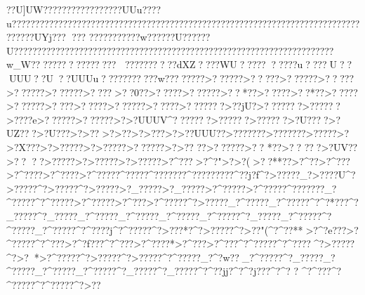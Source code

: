 {{{{{{{{{{{{{{{{{{{{{{{{{{{{{{{{{{{{{{{{{{{{{{{{{{{{{{{{{{{{{{{{{{{{{{{{{{{{{{{{{{{{{{{{{{{{{{{{{{{{{{{{{{{{{{{{{{{{{{{{{{{{{{{{{{{{{{{{{{{{{{{{{{{{{{{{{{{{{{{{{{{{{{{{{{{{{{{{{{{{{{{{{{{{{{{{{{{{{{{{{{{{{{{{{{{{{{{{{{{{{{{{{{{{{{{{{{{{{{{{{{{{{{{{{{{{{{{{{{{{{{{{{{{{{{{{{{{{{{{{{{{{{{{{{{{{{{{{{{{{{{{{{{{{{{{{{{{{{{{{{{{{{{{{{{{{{{{{{{{{{{{{{{{{{{{{{{{{{{{{{{{{{{{{{{{{{{{{{{{{{{{{{{{{{{{{{{{{{{{{{{{{{{{{{{{{{{{{{{{{{{{{{{{{{{{{{{{{{{{{{{{{{{{{{{{{{{{{{{{{{{{{{{{{{{{{{{{{{{{{{{{{{{{{{{{{{{{{{{{{{{{{{{{{{{{{{{{{{{{{{{{{{{{{{{{{{{{{{{{{{{{{{{{{{{{{{{{{{{{{{{{{{{{{{{{{{{{{{{{{{{{{{{{{{{{{{{{{{{{{{{{{{{{{{{{{{{{{{{{{{{{{{{{{{{{{{{{{{{{{{{{{{{{{{{{{{{{{{{{{{{{{{{{{{{{{{{{{{{{{{{{{{{{{{{{{{{{{{{{{{{{{{{{{{{{{{{{{{{{{{{{{{{{{{{{{{{{{{{{{{{{{{{{{{{{{{{{{{{{{{{{{{{{{{{{{{{{{{{{{{{{{{{{{{{{{{{{{{{{{{{{{{{{{{{{{{{{{{{{{{{{{{{{{{{{{{{{{{{{{{{{{{{{{{{{{{{{{{{{{{{{{{{{{{{{{{{{{{{{{{{{{{{{{{{{{{{{{{{{{{{{{{{{{{{{{{{{{{{{{{{{{{{{{{{{{{{{{{{{{{{{{{{{{{{{{{{{{{{{{{{{{{{{{{{{{{{{{{{{{{{{{{{{{{{{{{{{{{{{{{{{{{{{{{{{{{{{{{{{{{{{{{{{{{{{{{{{{{{{{{{{{{{{{{{{{{{{{{{{{{{{{{{{{{{{{{{{{{{{{{{{{{{{{{{{{{{{{{{{{{{{{{{{{{{{{{{{{{{{{{{{{{{{{{{{{{{{{{{{{{{{{{{{{{{{{{{{{{{{{{{{{{{{{{{{{{{{{{{{{{{{{{{{{{{{{{{{{{{{{{{{{{{{{{{{{{{{{{{{{{{{{{{{{{{{{{{{{{{{{{{{{{{{{{{{{{{{{{{{{{{{{{{{{{{{{{{{{{{{{{{{{{{{{{{{{{{{{{{{{{{{{{{{{{{{{{{{{{{{{{{{{{{{{{{{{{{{{{{{{{{{{{{{{{{{{{{{{{{{{{{{{{{{{{{{{{{{{{{{{{{{{{{{{{{{{{{{{{{{{{{{{{{{{{{{{{{{{{{{{{{{{{{{{{{{{{{{{{{{{{{{{{{{{{{{{{{{{{{{{{{{{{{{{{{{{{{{{{{{{{{{{{{{{{{{{{{{{{{{{{{{{{{{{{{{{{{{{{{{{{{{{{{{{{{{{{{{{{{{{{{{{{{{{{{{{{{{{{{{{{{{{{{{{{{{{{{{{{{{{{{{{{{{{{{{{{{{{{{{{{{{{{{{{{{{{{{{{{{{{{{{{{{{{{{{{{{{{{{{{{{{{{{{{{{{{{{{{{{{{{{{{{{{{{{{{{{{{{{{{{{{{{{{{{{{{{{{{{{{{{{{{{{{{{{{{{{{{{{{{{{{{{{{{{{{{{{{{{{{{{{{{{{{{{{{{{{{{{{{{{{{{{{{{{{{{{{{{{{{{{{{{{{{{{{{{{{{{{{{{{{{{{{{{{{{{{{{{{{{{{{{{{{{{{{{{{{{{{{{{{{{{{{{{{{{{{{{{{{{{{{{{{{{??U]UW??????????????    ???UUu}????u???????????    ??    ????????????????????????????????????????????????????????????????????UYj???  
???
???????????w??????U??????U?????????????????????????????????????????????????????????????????????w_W???????????????? 
??????????dXZ????WU??????????u????U??UUU??U  ??UUUu???????????w????????>??????>?????>??????>?????>??????>??????>????>??0??>?????>??????>??*??>?? ???>?? *??>?????>??????>????>?????>??????>?????>???????>??jU?>???????>??????>????e>??????>??????>?>?UUUV^???????>??????>??????>?U????>?UZ???>?U???>?>??  >?>??   >?>???  >?>??UUU??>???????>???????>?????>?>?X???>?>?????>?>?????>??????>?>??
??>??????>?? *??>??  ???>?UV??>?? 
??>?????>?>?????>?>?????>?^??? >?^?"   >?>?(  >??**??>?^??   >?^???  >?^???? >?^???? >?^?????^?????^???????^?????????^??j?f^?>?????_?>????U^?>?????^?>?????^?>?????>?_?????>?_?????>?^?????>?^?????^???????_?^?????^?^?????>?^?????>?^???>?^?????^?>?????_?^?????_?^?????^?^?*???^?_?????^?_?????_?^?????_?^?????_?^?????_?^?????^?_?????_?^?????^?^?????_?^?????^?^????j^?^?????^?>???*?^?>?????^?>? ?"(^?^??**>?^?e???>?^?????^?^???>?^?f???^?^???>?^????*>?^???>?^???^?^?????^?^????^?>?????^?>? *>?^?????^?>?????^?>?????^?^?????_?^?w??_?^?????^?_?????_?^?????_?^?????_?^?????^?_?????^?_?????^?^??jj?^?^?j???^?^?
 ?
^?^???^?^?????^?^?????^?>?? }}}}}}}}}}}}}}}}}}}}}}}}}}}}}}}}}}}}}}}}}}}}}}}}}}}}}}}}}}}}}}}}}}}}}}}}}}}}}}}}}}}}}}}}}}}}}}}}}}}}}}}}}}}}}}}}}}}}}}}}}}}}}}}}}}}}}}}}}}}}}}}}}}}}}}}}}}}}}}}}}}}}}}}}}}}}}}}}}}}}}}}}}}}}}}}}}}}}}}}}}}}}}}}}}}}}}}}}}}}}}}}}}}}}}}}}}}}}}}}}}}}}}}}}}}}}}}}}}}}}}}}}}}}}}}}}}}}}}}}}}}}}}}}}}}}}}}}}}}}}}}}}}}}}}}}}}}}}}}}}}}}}}}}}}}}}}}}}}}}}}}}}}}}}}}}}}}}}}}}}}}}}}}}}}}}}}}}}}}}}}}}}}}}}}}}}}}}}}}}}}}}}}}}}}}}}}}}}}}}}}}}}}}}}}}}}}}}}}}}}}}}}}}}}}}}}}}}}}}}}}}}}}}}}}}}}}}}}}}}}}}}}}}}}}}}}}}}}}}}}}}}}}}}}}}}}}}}}}}}}}}}}}}}}}}}}}}}}}}}}}}}}}}}}}}}}}}}}}}}}}}}}}}}}}}}}}}}}}}}}}}}}}}}}}}}}}}}}}}}}}}}}}}}}}}}}}}}}}}}}}}}}}}}}}}}}}}}}}}}}}}}}}}}}}}}}}}}}}}}}}}}}}}}}}}}}}}}}}}}}}}}}}}}}}}}}}}}}}}}}}}}}}}}}}}}}}}}}}}}}}}}}}}}}}}}}}}}}}}}}}}}}}}}}}}}}}}}}}}}}}}}}}}}}}}}}}}}}}}}}}}}}}}}}}}}}}}}}}}}}}}}}}}}}}}}}}}}}}}}}}}}}}}}}}}}}}}}}}}}}}}}}}}}}}}}}}}}}}}}}}}}}}}}}}}}}}}}}}}}}}}}}}}}}}}}}}}}}}}}}}}}}}}}}}}}}}}}}}}}}}}}}}}}}}}}}}}}}}}}}}}}}}}}}}}}}}}}}}}}}}}}}}}}}}}}}}}}}}}}}}}}}}}}}}}}}}}}}}}}}}}}}}}}}}}}}}}}}}}}}}}}}}}}}}}}}}}}}}}}}}}}}}}}}}}}}}}}}}}}}}}}}}}}}}}}}}}}}}}}}}}}}}}}}}}}}}}}}}}}}}}}}}}}}}}}}}}}}}}}}}}}}}}}}}}}}}}}}}}}}}}}}}}}}}}}}}}}}}}}}}}}}}}}}}}}}}}}}}}}}}}}}}}}}}}}}}}}}}}}}}}}}}}}}}}}}}}}}}}}}}}}}}}}}}}}}}}}}}}}}}}}}}}}}}}}}}}}}}}}}}}}}}}}}}}}}}}}}}}}}}}}}}}}}}}}}}}}}}}}}}}}}}}}}}}}}}}}}}}}}}}}}}}}}}}}}}}}}}}}}}}}}}}}}}}}}}}}}}}}}}}}}}}}}}}}}}}}}}}}}}}}}}}}}}}}}}}}}}}}}}}}}}}}}}}}}}}}}}}}}}}}}}}}}}}}}}}}}}}}}}}}}}}}}}}}}}}}}}}}}}}}}}}}}}}}}}}}}}}}}}}}}}}}}}}}}}}}}}}}}}}}}}}}}}}}}}}}}}}}}}}}}}}}}}}}}}}}}}}}}}}}}}}}}}}}}}}}}}}}}}}}}}}}}}}}}}}}}}}}}}}}}}}}}}}}}}}}}}}}}}}}}}}}}}}}}}}}}}}}}}}}}}}}}}}}}}}}}}}}}}}}}}}}}}}}}}}}}}}}}}}}}}}}}}}}}}}}}}}}}}}}}}}}}}}}}}}}}}}}}}}}}}}}}}}}}}}}}}}}}}}}}}}}}}}}}}}}}}}}}}}}}}}}}}}}}}}}}}}}}}}}}}}}}}}}}}}}}}}}}}}}}}}}}}}}}}}}}}}}}}}}}}}}}}}}}}}}}}}}}}}}}}}}}}}}}}}}}}}}}}}}}}}}}}}}}}}}}}}}}}}}}}}
